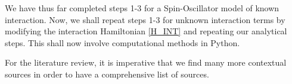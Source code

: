 \documentclass[12pt,a4paper]{article}
\begin{document}
We have thus far completed steps 1-3 for a Spin-Oscillator model of known interaction. Now, we shall repeat steps 1-3 for unknown interaction terms by modifying the interaction Hamiltonian \eqref{H_INT} and repeating our analytical steps. This shall now involve computational methods in Python.

For the literature review, it is imperative that we find many more contextual sources in order to have a comprehensive list of sources. 


\newpage

 
 
\end{document}
